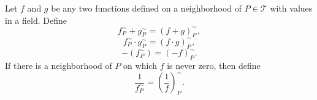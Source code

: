 Let $f$ and $g$ be any two functions defined on a neighborhood of $P \in \mathcal{T}$ with values in a field. Define
$$f_P^\sim + g_P^\sim = (f + g)_P^\sim,$$
$$f_P^\sim \cdot g_P^\sim = (f \cdot g)_P^\sim,$$
$$-(f_P^\sim) = (-f)_P^\sim.$$
If there is a neighborhood of $P$ on which $f$ is never zero, then define
$$\frac{1}{f_P^\sim} = \left(\frac{1}{f}\right)_P^\sim.$$
